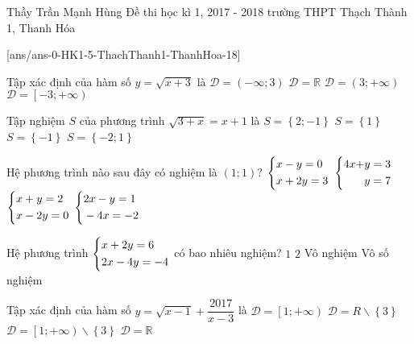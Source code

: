 \begin{name}
{Thầy Trần Mạnh Hùng}
{Đề thi học kì 1, 2017 - 2018 trường THPT Thạch Thành 1, Thanh Hóa}
\end{name}
\setcounter{ex}{0}
[ans/ans-0-HK1-5-ThachThanh1-ThanhHoa-18]
\begin{ex}%
Tập xác định của hàm số $y=\sqrt{x+3}$ là
\choice
{$\mathscr{D}=\left(-\infty;3\right)$}
{$\mathscr{D}=\mathbb{R}$}
{$\mathscr{D}=\left(3;+\infty\right)$}
{\True $\mathscr{D}=\left[-3;+\infty\right)$}
\end{ex}
\begin{ex}%
Tập nghiệm $S$ của phương trình $\sqrt{3+x}=x+1$ là
\choice
{$S=\left\{2;-1\right\}$}
{\True $S=\left\{1\right\}$}
{$S=\left\{-1\right\}$}
{$S=\left\{-2;1\right\}$}
\end{ex}
\begin{ex}%
Hệ phương trình nào sau đây có nghiệm là $(1;1)$?
\choice
{\True $\left\{\begin{aligned}&x-y=0\\&x+2y=3\end{aligned}\right.$}
{$\left\{\begin{aligned}4x+&y=3\\&y=7\end{aligned}\right.$}
{$\left\{\begin{aligned}&x+y=2\\&x-2y=0\end{aligned}\right.$}
{$\left\{\begin{aligned}&2x-y=1\\&-4x=-2\end{aligned}\right.$}
\end{ex}
\begin{ex}%
Hệ phương trình $\left\{\begin{aligned}&x+2y=6\\&2x-4y=-4\end{aligned}\right.$ có bao nhiêu nghiệm?
\choice
{\True $1$}
{$2$}
{Vô nghiệm}
{Vô số nghiệm}
\end{ex}
\begin{ex}%
Tập xác định của hàm số $y=\sqrt{x-1}+\dfrac{2017}{x-3}$ là
\choice
{$\mathscr{D}=\left[1;+\infty\right)$}
{$\mathscr{D}=R\backslash\left\{3\right\}$}
{\True $\mathscr{D}=\left[1;+\infty\right)\backslash\left\{3\right\}$}
{$\mathscr{D}=\mathbb{R}$}
\end{ex}
